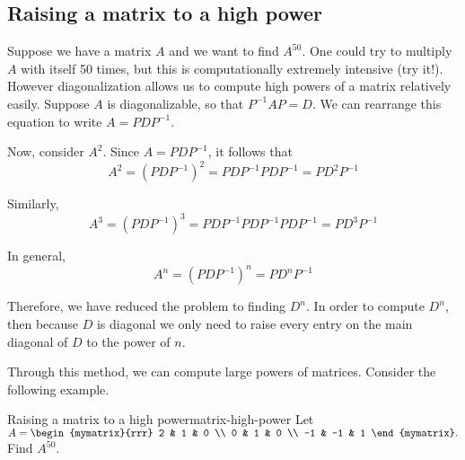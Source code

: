 \subsection{Raising a matrix to a high power}

Suppose we have a matrix $A$ and we want to find $A^{50}$. One could
try to multiply $A$ with itself 50 times, but this is computationally
extremely intensive (try it!). However diagonalization allows us to
compute high powers of a matrix relatively easily.  Suppose $A$ is
diagonalizable, so that $P^{-1}AP=D$. We can rearrange this equation
to write $A=PDP^{-1}$.

Now, consider $A^{2}$. Since $A=PDP^{-1}$, it follows that 
\begin{equation*}
A^{2} = (PDP^{-1}) ^{2}=PDP^{-1}PDP^{-1}=PD^{2}P^{-1}
\end{equation*}

Similarly, 
\begin{equation*}
A^3 = (PDP^{-1}) ^{3}=PDP^{-1}PDP^{-1}PDP^{-1}=PD^{3}P^{-1}
\end{equation*}

In general,
\begin{equation*}
A^n = (PDP^{-1}) ^{n}=PD^{n}P^{-1}
\end{equation*}

Therefore, we have reduced the problem to finding $D^{n}$. In order to
compute $D^{n}$, then because $D$ is diagonal we only need to raise
every entry on the main diagonal of $D$ to the power of $n$.

Through this method, we can compute large powers of matrices. Consider the following example.

\begin{example}{Raising a matrix to a high power}{matrix-high-power}
Let
  $A=\begin{mymatrix}{rrr}
2 & 1 & 0 \\
0 & 1 & 0 \\
-1 & -1 & 1
\end{mymatrix}. $ Find $A^{50}$.
\end{example}

